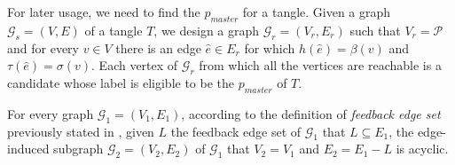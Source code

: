 For later usage, we need to find the $p_{master}$ for a tangle.
Given a \genGraph graph $\mathcal{G}_s=(V, E)$ of a tangle $T$, we design a graph $\mathcal{G}_{r}=(V_r,E_r)$ such that $V_r=\mathcal{P}$ and for every $v \in V$ there is an edge $\hat{e} \in E_r$ for which $h(\hat{e}) = \beta(v)$ and $\tau(\hat{e}) = \sigma(v)$. Each vertex of $\mathcal{G}_{r}$ from which all the vertices are reachable \cite{bang2008digraphs} is a candidate whose label is eligible to be the $p_{master}$ of $T$.





For every graph $\mathcal{G}_1=(V_1, E_1)$, according to the definition of {\it feedback edge set} previously stated in \cite{bondy2000graph}, given $L$ the feedback edge set of $\mathcal{G}_1$ that $L \subseteq E_1$, the edge-induced subgraph $\mathcal{G}_2=(V_2, E_2)$ of $\mathcal{G}_1$ that $V_2=V_1$ and $E_2=E_1-L$ is acyclic.

